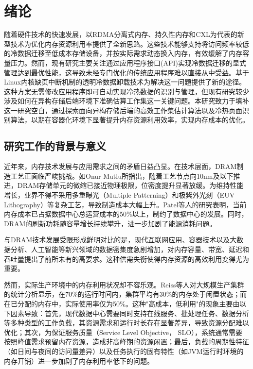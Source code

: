 \chapter{绪\hspace{6pt}论}

随着硬件技术的快速发展，以RDMA分离式内存、持久性内存和CXL为代表的新型技术为优化内存资源利用率提供了全新思路。这些技术能够支持将访问频率较低的冷数据迁移至低成本存储设备，并按实际需求动态换入内存，有效缓解了内存容量压力。然而，现有研究主要关注通过应用程序接口(API)实现冷数据迁移的显式管理达到最优性能，这导致未经专门优化的传统应用程序难以直接从中受益。基于Linux内核缺页中断机制的透明冷数据卸载技术为解决这一问题提供了新的途径。这种方案无需修改应用程序即可自动实现冷热数据的识别与管理，但现有研究较少涉及如何在异构存储后端环境下准确估算工作集这一关键问题。本研究致力于填补这一研究空白，通过探索面向异构存储后端的高效工作集估计算法以及冷热页面识别算法，以期在容器化环境下显著提升内存资源利用效率，实现内存成本的优化。

\section{研究工作的背景与意义}

近年来，内存技术发展与应用需求之间的矛盾日益凸显。在技术层面，DRAM制造工艺正面临严峻挑战。如Onur Mutlu所指出，随着工艺节点向10nm及以下推进，DRAM存储单元的微缩已接近物理极限，位密度提升显著放缓。为维持性能增长，业界不得不采用多重曝光（Multiple Patterning）和极紫外光刻（EUV Lithography）等复杂工艺，导致制造成本大幅上升。Patel等人的研究表明，当前内存成本已占据数据中心总运营成本的50\%以上，制约了数据中心的发展。同时，DRAM的刷新功耗随容量增长持续攀升，进一步加剧了能源消耗问题。

与DRAM技术发展受限形成鲜明对比的是，现代互联网应用、容器技术以及大数据分析、人工智能等新兴领域的数据密集度急剧增加，对内存容量、带宽、延迟和吞吐量提出了前所未有的高要求。这种供需失衡使得内存资源的高效利用变得尤为重要。

然而，实际生产环境中的内存利用状况却不容乐观。Reiss等人对大规模生产集群的统计分析显示，在70\%的运行时间内，集群平均有30\%的内存处于闲置状态；而在已分配的内存中，实际使用率仅为50\%。这种"高成本，低利用"的现象主要由以下因素导致：首先，现代数据中心需要同时支持在线服务、批处理任务、数据分析等多种类型的工作负载，其资源需求和运行时长存在显著差异，导致资源分配难以优化；其次，为保证服务质量（Service Level Objective， SLO），系统通常需要按照峰值需求预留内存资源，造成非高峰期的资源闲置；最后，负载的周期性特征（如日间与夜间的访问量差异）以及任务执行的固有特性（如JVM运行时环境的内存开销）进一步加剧了内存利用率低下的问题。

